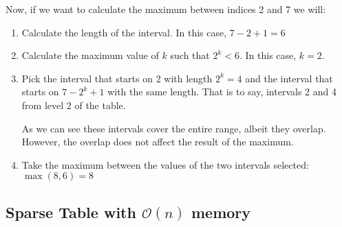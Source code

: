 \documentclass[12pt]{report}
\begin{document}
\begin{figure}[h!]
\end{figure}

\noindent
Now, if we want to calculate the maximum between indices 2 and 7 we will:
\begin{enumerate}
		\setlength{\itemsep}{2pt}
		\item Calculate the length of the interval. In this case, $7-2+1=6$
		\item Calculate the maximum value of $k$  such that $2^k<6$. In this
				case, $k=2$.
		\item Pick the interval that starts on 2 with length $2^k=4$ and the
				interval that starts on $7-2^k+1$ with the same length. 
				That is to say, intervals 2 and 4 from level 2 of the table.

				As we can see these intervals cover the entire range, albeit 
				they overlap. However, the overlap does not affect the result
				of the maximum.
		\item Take the maximum between the values of the two intervals 
				selected: $\max(8,6)=8$
\end{enumerate}

\newpage
{}
\newpage

\subsection{Sparse Table with $\mathcal{O}(n)$ memory}
\end{document}
